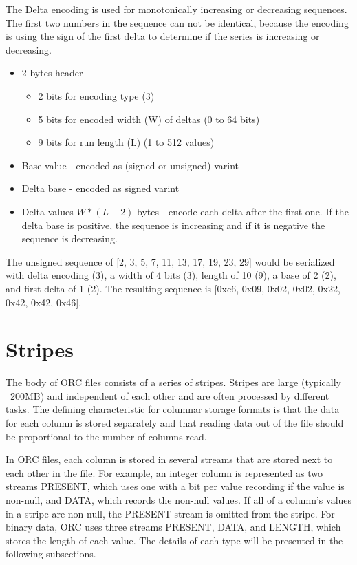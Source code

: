 \documentclass{article}
\begin{document}
The Delta encoding is used for monotonically increasing or decreasing
sequences. The first two numbers in the sequence can not be identical,
because the encoding is using the sign of the first delta to determine
if the series is increasing or decreasing.

\begin{itemize}
\item 2 bytes header
  \begin{itemize}
  \item 2 bits for encoding type (3)
  \item 5 bits for encoded width (W) of deltas (0 to 64 bits)
  \item 9 bits for run length (L) (1 to 512 values)
  \end{itemize}
\item Base value - encoded as (signed or unsigned) varint
\item Delta base - encoded as signed varint
\item Delta values $W * (L - 2)$ bytes - encode each delta after the first
  one. If the delta base is positive, the sequence is increasing and if it is
  negative the sequence is decreasing.
\end{itemize}

The unsigned sequence of [2, 3, 5, 7, 11, 13, 17, 19, 23, 29] would be
serialized with delta encoding (3), a width of 4 bits (3), length of
10 (9), a base of 2 (2), and first delta of 1 (2). The resulting
sequence is [0xc6, 0x09, 0x02, 0x02, 0x22, 0x42, 0x42, 0x46].

\section{Stripes}

The body of ORC files consists of a series of stripes. Stripes are
large (typically ~200MB) and independent of each other and are often
processed by different tasks. The defining characteristic for columnar
storage formats is that the data for each column is stored separately
and that reading data out of the file should be proportional to the
number of columns read.

In ORC files, each column is stored in several streams that are stored
next to each other in the file. For example, an integer column is
represented as two streams PRESENT, which uses one with a bit per
value recording if the value is non-null, and DATA, which records the
non-null values. If all of a column's values in a stripe are non-null,
the PRESENT stream is omitted from the stripe. For binary data, ORC
uses three streams PRESENT, DATA, and LENGTH, which stores the length
of each value. The details of each type will be presented in the
following subsections.
\end{document}
